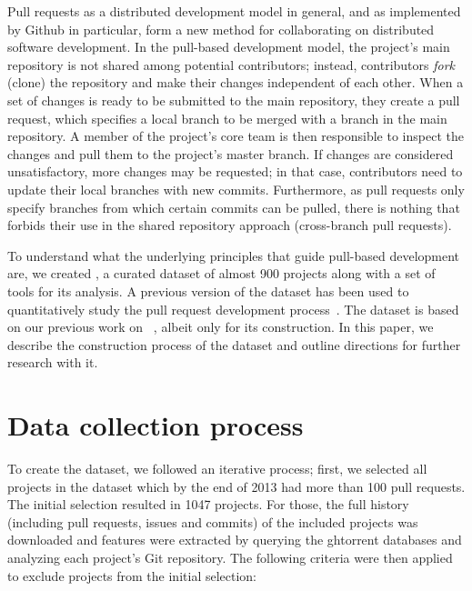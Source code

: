 \documentclass{sig-alternate}
\begin{document}
Pull requests as a distributed development model in general, and as implemented
by Github in particular, form a new method for collaborating on distributed
software development. In the pull-based development model, the project's main
repository is not shared among potential contributors; instead, contributors
\emph{fork} (clone) the repository and make their changes independent of each
other. When a set of changes is ready to be submitted to the main repository,
they create a pull request, which specifies a local branch to be merged with a
branch in the main repository. A member of the project's core team is then
responsible to inspect the changes and pull them to the project's master branch.
If changes are considered unsatisfactory, more changes may be requested; in that
case, contributors need to update their local branches with new commits.
Furthermore, as pull requests only specify branches from which certain commits
can be pulled, there is nothing that forbids their use in the shared 
repository approach (cross-branch pull requests).

To understand what the underlying principles that guide pull-based development
are, we created \pullreqs, a curated dataset of almost 900 projects along with a
set of tools for its analysis. A previous version of the dataset has been used
to quantitatively study the pull request development process~\cite{GPD14}. The
\pullreqs dataset is based on our previous work on \ghtorrent~\cite{Gousi13}, albeit only for
its construction. In this paper, we describe the construction process of the
dataset and outline directions for further research with it.

\section{Data collection process}
\label{sec:expdata}

To create the dataset, we followed an iterative process; first, we selected all
projects in the \ghtorrent dataset which by the end of 2013 had more than 100
pull requests. The initial selection resulted in 1047 projects. For those, the
full history (including pull requests, issues and commits) of the included
projects was downloaded and features were extracted by querying the {\sc
ght}orrent databases and analyzing each project's Git repository. The following
criteria were then applied to exclude projects from the initial selection:
\end{document}
